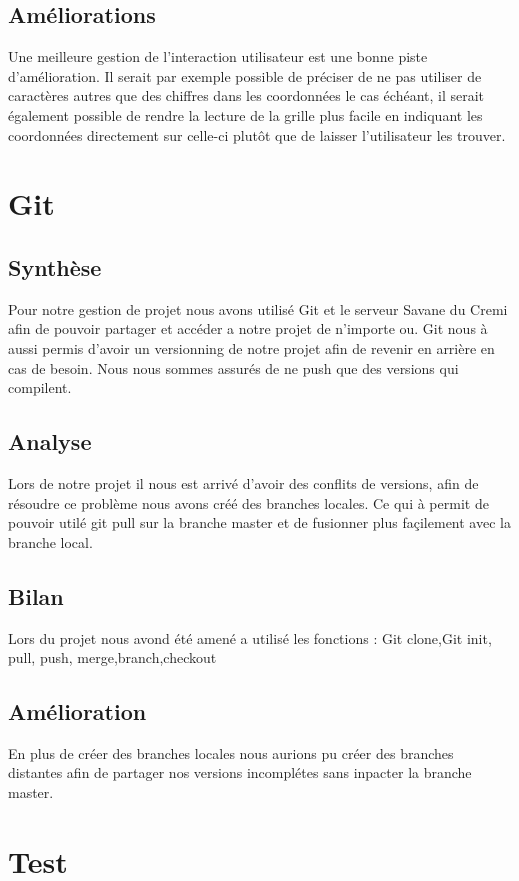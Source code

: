\documentclass[12pt]{article}
\begin{document}
\subsection{Améliorations}

Une meilleure gestion de l'interaction utilisateur est une bonne piste d'amélioration.
Il serait par exemple possible de préciser de ne pas utiliser de caractères autres que
des chiffres dans les coordonnées le cas échéant, il serait également possible de rendre
la lecture de la grille plus facile en indiquant les coordonnées directement sur celle-ci 
plutôt que de laisser l'utilisateur les trouver.



\section{Git}
\subsection{Synthèse}
Pour notre gestion de projet nous avons utilisé Git et le serveur Savane du Cremi afin de pouvoir partager et accéder a notre projet de n'importe ou.
Git nous à aussi permis d'avoir un versionning de notre projet afin de revenir en arrière en cas de besoin.
Nous nous sommes assurés de ne push que des versions qui compilent.
\subsection{Analyse}
Lors de notre projet il nous est arrivé d'avoir des conflits de versions, afin de résoudre ce problème nous avons créé des branches locales. 
Ce qui à permit de pouvoir utilé git pull sur la branche master et de fusionner plus façilement avec la branche local.
\subsection{Bilan}
Lors du projet nous avond été amené a utilisé les fonctions : Git clone,Git init, pull, push, merge,branch,checkout
\subsection{Amélioration}
En plus de créer des branches locales nous aurions pu créer des branches distantes afin de partager nos versions incomplétes sans inpacter la branche master.



\section{Test}
\end{document}
